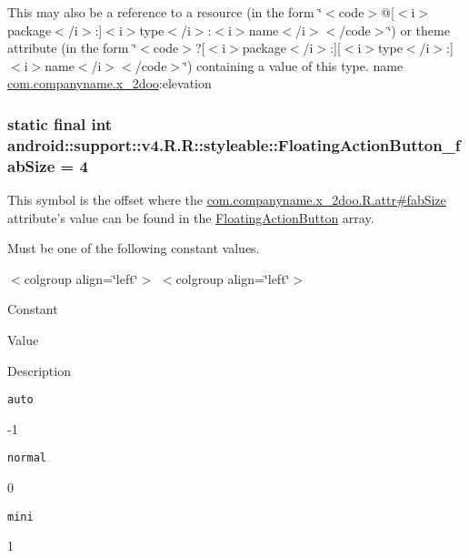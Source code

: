 This may also be a reference to a resource (in the form \char`\"{}$<$code$>$@\mbox{[}$<$i$>$package$<$/i$>$:\mbox{]}$<$i$>$type$<$/i$>$:$<$i$>$name$<$/i$>$$<$/code$>$\char`\"{}) or theme attribute (in the form \char`\"{}$<$code$>$?\mbox{[}$<$i$>$package$<$/i$>$:\mbox{]}\mbox{[}$<$i$>$type$<$/i$>$:\mbox{]}$<$i$>$name$<$/i$>$$<$/code$>$\char`\"{}) containing a value of this type.  name \hyperlink{namespacecom_1_1companyname_1_1x__2doo}{com.companyname.x\_\-2doo}:elevation \hypertarget{classandroid_1_1support_1_1v4_1_1_r_1_1styleable_47e11e2375cc45dd871a519e2df82ea3}{
\subsubsection[{FloatingActionButton\_\-fabSize}]{\setlength{\rightskip}{0pt plus 5cm}static final int android::support::v4.R.R::styleable::FloatingActionButton\_\-fabSize = 4}}
\label{classandroid_1_1support_1_1v4_1_1_r_1_1styleable_47e11e2375cc45dd871a519e2df82ea3}


This symbol is the offset where the \hyperlink{classcom_1_1companyname_1_1x__2doo_1_1_r_1_1attr_f2795ff51ff06c73216e6ddece6ad1fc}{com.companyname.x\_\-2doo.R.attr\#fabSize} attribute's value can be found in the \hyperlink{classandroid_1_1support_1_1v4_1_1_r_1_1styleable_51a0276d7190a1195d58170b1623ab3c}{FloatingActionButton} array.

Must be one of the following constant values. \begin{TabularC}{0}
\hline
\end{TabularC}
$<$colgroup align=\char`\"{}left\char`\"{}$>$ $<$colgroup align=\char`\"{}left\char`\"{}$>$ 

Constant

Value

Description 

{\tt auto}

-1

{\tt normal}

0

{\tt mini}

1


